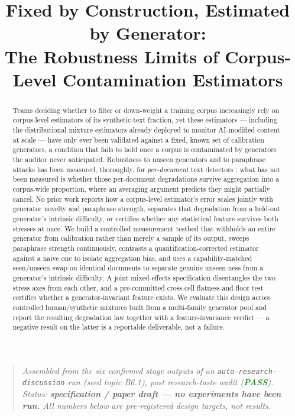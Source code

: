 \documentclass[11pt]{article}
\title{\textbf{Fixed by Construction, Estimated by Generator:\\ The Robustness Limits of Corpus-Level Contamination Estimators}}
\author{}
\date{}
\begin{document}
\maketitle
\vspace{-2em}

\begin{quote}
\small\textit{Assembled from the six confirmed stage outputs of an \texttt{auto-research-discussion} run (seed topic B6.1), post research-taste audit (\textcolor{ForestGreen}{\textbf{PASS}}). Status: \textbf{specification / paper draft --- no experiments have been run.} All numbers below are pre-registered design targets, not results.}
\end{quote}

\begin{abstract}
Teams deciding whether to filter or down-weight a training corpus increasingly rely on corpus-level estimators of its synthetic-text fraction, yet these estimators --- including the distributional mixture estimators already deployed to monitor AI-modified content at scale \citep{MonitoringAIContent2024} --- have only ever been validated against a fixed, known set of calibration generators, a condition that fails to hold once a corpus is contaminated by generators the auditor never anticipated. Robustness to unseen generators and to paraphrase attacks has been measured, thoroughly, for \emph{per-document} text detectors \citep{RAID2024Benchmark,MAGE2024InTheWild}; what has not been measured is whether those per-document degradations survive aggregation into a corpus-wide proportion, where an averaging argument predicts they might partially cancel. No prior work reports how a corpus-level estimator's error scales jointly with generator novelty and paraphrase strength, separates that degradation from a held-out generator's intrinsic difficulty, or certifies whether any statistical feature survives both stresses at once. We build a controlled measurement testbed that withholds an entire generator from calibration rather than merely a sample of its output, sweeps paraphrase strength continuously, contrasts a quantification-corrected estimator against a naive one to isolate aggregation bias, and uses a capability-matched seen/unseen swap on identical documents to separate genuine unseen-ness from a generator's intrinsic difficulty. A joint mixed-effects specification disentangles the two stress axes from each other, and a pre-committed cross-cell flatness-and-floor test certifies whether a generator-invariant feature exists. We evaluate this design across controlled human/synthetic mixtures built from a multi-family generator pool and report the resulting degradation law together with a feature-invariance verdict --- a negative result on the latter is a reportable deliverable, not a failure.
\end{abstract}
\end{document}
